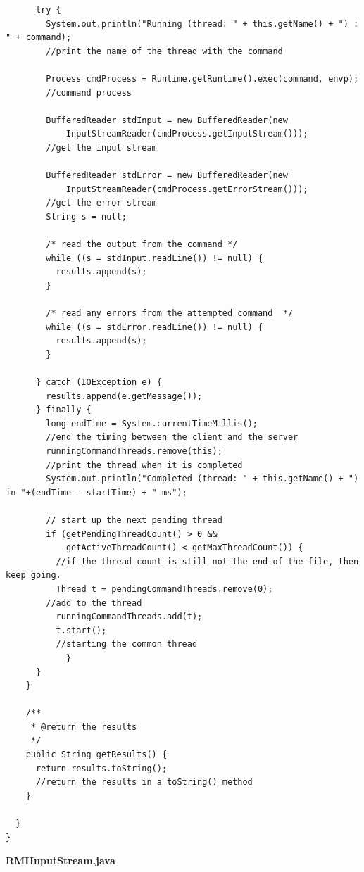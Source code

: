 \documentclass{article}
\begin{document}
\begin{lstlisting}
      try {
        System.out.println("Running (thread: " + this.getName() + ") : " + command);
        //print the name of the thread with the command

        Process cmdProcess = Runtime.getRuntime().exec(command, envp);
        //command process 

        BufferedReader stdInput = new BufferedReader(new
            InputStreamReader(cmdProcess.getInputStream()));
        //get the input stream

        BufferedReader stdError = new BufferedReader(new
            InputStreamReader(cmdProcess.getErrorStream()));
        //get the error stream  
        String s = null;

        /* read the output from the command */
        while ((s = stdInput.readLine()) != null) {
          results.append(s);
        }

        /* read any errors from the attempted command  */
        while ((s = stdError.readLine()) != null) {
          results.append(s);
        }

      } catch (IOException e) {
        results.append(e.getMessage());
      } finally {
        long endTime = System.currentTimeMillis();
        //end the timing between the client and the server
        runningCommandThreads.remove(this);
        //print the thread when it is completed
        System.out.println("Completed (thread: " + this.getName() + ") in "+(endTime - startTime) + " ms");

        // start up the next pending thread
        if (getPendingThreadCount() > 0 &&
            getActiveThreadCount() < getMaxThreadCount()) {
          //if the thread count is still not the end of the file, then keep going.
          Thread t = pendingCommandThreads.remove(0);
        //add to the thread
          runningCommandThreads.add(t);
          t.start();
          //starting the common thread
            }
      }
    }

    /**
     * @return the results
     */
    public String getResults() {
      return results.toString();
      //return the results in a toString() method
    }

  }
}

\end{lstlisting}

\textbf{RMIInputStream.java}
\end{document}
